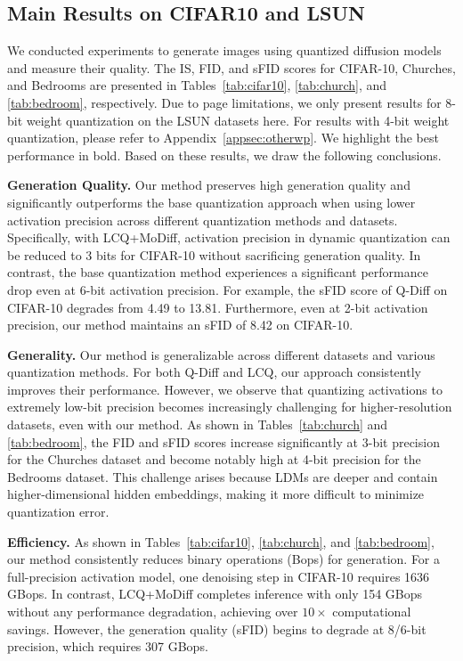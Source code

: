 \subsection{Main Results on CIFAR10 and LSUN}
\label{subsec:results}


We conducted experiments to generate images using quantized diffusion models and measure their quality. The IS, FID, and sFID scores for CIFAR-10, Churches, and Bedrooms are presented in Tables~\ref{tab:cifar10}, \ref{tab:church}, and \ref{tab:bedroom}, respectively. Due to page limitations, we only present results for 8-bit weight quantization on the LSUN datasets here. For results with 4-bit weight quantization, please refer to Appendix~\ref{appsec:otherwp}. We highlight the best performance in bold. Based on these results, we draw the following conclusions.

\textbf{Generation Quality.} Our method preserves high generation quality and significantly outperforms the base quantization approach when using lower activation precision across different quantization methods and datasets. Specifically, with LCQ+MoDiff, activation precision in dynamic quantization can be reduced to 3 bits for CIFAR-10 without sacrificing generation quality. In contrast, the base quantization method experiences a significant performance drop even at 6-bit activation precision. For example, the sFID score of Q-Diff on CIFAR-10 degrades from 4.49 to 13.81. Furthermore, even at 2-bit activation precision, our method maintains an sFID of 8.42 on CIFAR-10.

\textbf{Generality.} Our method is generalizable across different datasets and various quantization methods. For both Q-Diff and LCQ, our approach consistently improves their performance. However, we observe that quantizing activations to extremely low-bit precision becomes increasingly challenging for higher-resolution datasets, even with our method. As shown in Tables~\ref{tab:church} and \ref{tab:bedroom}, the FID and sFID scores increase significantly at 3-bit precision for the Churches dataset and become notably high at 4-bit precision for the Bedrooms dataset. This challenge arises because LDMs are deeper and contain higher-dimensional hidden embeddings, making it more difficult to minimize quantization error.

\textbf{Efficiency.} As shown in Tables~\ref{tab:cifar10}, \ref{tab:church}, and \ref{tab:bedroom}, our method consistently reduces binary operations (Bops) for generation. For a full-precision activation model, one denoising step in CIFAR-10 requires 1636 GBops. In contrast, LCQ+MoDiff completes inference with only 154 GBops without any performance degradation, achieving over $10\times$ computational savings. However, the generation quality (sFID) begins to degrade at 8/6-bit precision, which requires 307 GBops.



